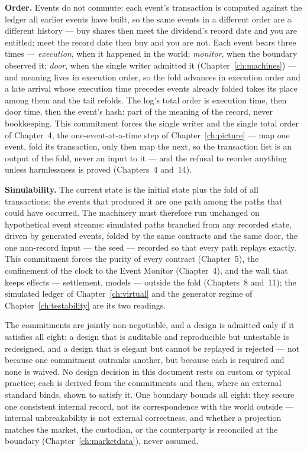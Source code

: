 \documentclass[11pt,a4paper]{article}
\begin{document}
\textbf{Order.} Events do not commute: each event's transaction is computed against the
ledger all earlier events have built, so the same events in a different order are a
different history --- buy shares then meet the dividend's record date and you are
entitled; meet the record date then buy and you are not. Each event bears three times ---
\emph{execution}, when it happened in the world; \emph{monitor}, when the boundary observed
it; \emph{door}, when the single writer admitted it (Chapter~\ref{ch:machines}) --- and
meaning lives in execution order, so the fold advances in execution order and a late arrival
whose execution time precedes events already folded takes its place among them and the tail
refolds. The log's total order is execution time, then door time, then the event's hash:
part of the meaning of the record, never bookkeeping. This commitment forces the single
writer and the single total order of Chapter~4, the one-event-at-a-time step of
Chapter~\ref{ch:picture} --- map one event, fold its transaction, only then map the
next, so the transaction list is an output of the fold, never an input to it --- and
the refusal to reorder anything unless harmlessness is proved (Chapters~4 and~14).

\textbf{Simulability.} The current state is the initial state plus the fold of all
transactions; the events that produced it are one path among the paths that could have
occurred. The machinery must therefore run unchanged on hypothetical event streams:
simulated paths branched from any recorded state, driven by generated events, folded by
the same contracts and the same door, the one non-record input --- the seed --- recorded
so that every path replays exactly. This commitment forces the purity of every contract
(Chapter~5), the confinement of the clock to the Event Monitor (Chapter~4), and the wall
that keeps effects --- settlement, models --- outside the fold (Chapters~8 and~11); the
simulated ledger of Chapter~\ref{ch:virtual} and the generator regime of
Chapter~\ref{ch:testability} are its two readings.

The commitments are jointly non-negotiable, and a design is admitted only if it
satisfies all eight: a design that is auditable and reproducible but untestable is
redesigned, and a design that is elegant but cannot be replayed is rejected --- not
because one commitment outranks another, but because each is required and none is
waived. No design decision in this document rests on custom or typical
practice; each is derived from the commitments and then, where an external standard
binds, shown to satisfy it. One boundary bounds all eight: they secure one consistent
internal record, not its correspondence with the world outside --- internal
unbreakability is not external correctness, and whether a projection matches the market,
the custodian, or the counterparty is reconciled at the boundary
(Chapter~\ref{ch:marketdata}), never assumed.
\end{document}

